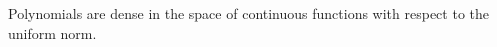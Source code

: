 \begin{myTheorem}
Polynomials are dense in the space of continuous functions with respect to the uniform norm.
\end{myTheorem}

\endinput  %